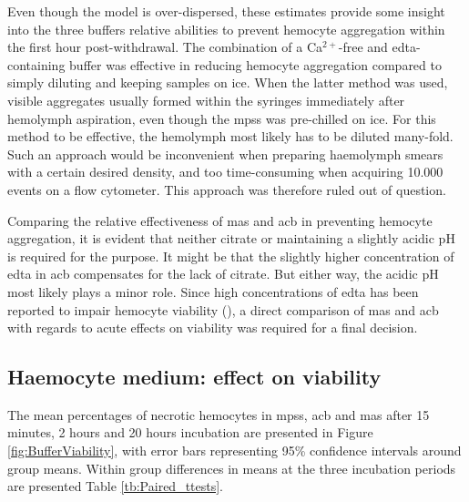 Even though the model is over-dispersed, these estimates provide some insight into the three buffers relative abilities to prevent hemocyte aggregation within the first hour post-withdrawal. The combination of a Ca$^{2+}$-free and \acrshort{edta}-containing buffer was effective in reducing hemocyte aggregation compared to simply diluting and keeping samples on ice. When the latter method was used, visible aggregates usually formed within the syringes immediately after hemolymph aspiration, even though the \acrshort{mpss} was pre-chilled on ice. For this method to be effective, the hemolymph most likely has to be diluted many-fold. Such an approach would be inconvenient when preparing haemolymph smears with a certain desired density, and too time-consuming when acquiring 10.000 events on a flow cytometer. This approach was therefore ruled out of question.

Comparing the relative effectiveness of \acrshort{mas} and \acrshort{acb} in preventing hemocyte aggregation, it is evident that neither citrate or maintaining a slightly acidic pH is required for the purpose. It might be that the slightly higher concentration of \acrshort{edta} in \acrshort{acb} compensates for the lack of citrate. But either way, the acidic pH most likely plays a minor role. Since high concentrations of \acrshort{edta} has been reported to impair hemocyte viability (\cite{Grandiosa2018, Burkhard2009}), a direct comparison of \acrshort{mas} and \acrshort{acb} with regards to acute effects on viability was required for a final decision.

\subsection{Haemocyte medium: effect on viability}
 The mean percentages of necrotic hemocytes in \acrshort{mpss}, \acrshort{acb} and \acrshort{mas} after 15 minutes, 2 hours and 20 hours incubation are presented in Figure \ref{fig:BufferViability}, with error bars representing 95\% confidence intervals around group means. Within group differences in means at the three incubation periods are presented Table \ref{tb:Paired_ttests}.

